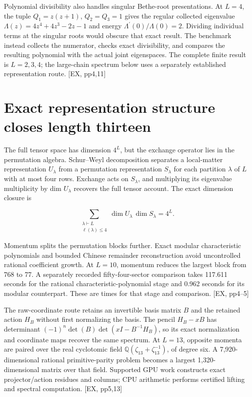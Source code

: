 Polynomial divisibility also handles singular Bethe-root presentations. At \(L=4\), the tuple \(Q_1=z(z+1)\), \(Q_2=Q_3=1\) gives the regular collected eigenvalue \(\Lambda(z)=4z^4+4z^3-2z-1\) and energy \(\Lambda^\prime(0)/\Lambda(0)=2\). Dividing individual terms at the singular roots would obscure that exact result. The benchmark instead collects the numerator, checks exact divisibility, and compares the resulting polynomial with the actual joint eigenspaces. The complete finite result is \(L=2,3,4\); the large-chain spectrum below uses a separately established representation route. {[}EX, pp4,11{]}

\section{Exact representation structure closes length thirteen}\label{exact-representation-structure-closes-length-thirteen}

The full tensor space has dimension \(4^L\), but the exchange operator lies in the permutation algebra. Schur--Weyl decomposition separates a local-matter representation \(U_\lambda\) from a permutation representation \(S_\lambda\) for each partition \(\lambda\) of \(L\) with at most four rows. Exchange acts on \(S_\lambda\), and multiplying its eigenvalue multiplicity by dim \(U_\lambda\) recovers the full tensor account. The exact dimension closure is

\[
\sum_{\substack{\lambda\vdash L\\\ell(\lambda)\le4}}\dim U_\lambda\,\dim S_\lambda=4^L.
\]

Momentum splits the permutation blocks further. Exact modular characteristic polynomials and bounded Chinese remainder reconstruction avoid uncontrolled rational coefficient growth. At \(L=10\), momentum reduces the largest block from 768 to 77. A separately recorded fifty-four-sector comparison takes 117.611 seconds for the rational characteristic-polynomial stage and 0.962 seconds for its modular counterpart. These are times for that stage and comparison. {[}EX, pp4--5{]}

The raw-coordinate route retains an invertible basis matrix \(B\) and the retained action \(H_B\) without first normalizing the basis. The pencil \(H_B-xB\) has determinant \((-1)^n\det(B)\det(xI-B^{-1}H_B)\), so its exact normalization and coordinate maps recover the same spectrum. At \(L=13\), opposite momenta are paired over the real cyclotomic field \(\mathbb Q(\zeta_{13}+\zeta_{13}^{-1})\), of degree six. A 7,920-dimensional rational primitive-parity problem becomes a largest 1,320-dimensional matrix over that field. Supported GPU work constructs exact projector/action residues and columns; CPU arithmetic performs certified lifting and spectral computation. {[}EX, pp5,13{]}

